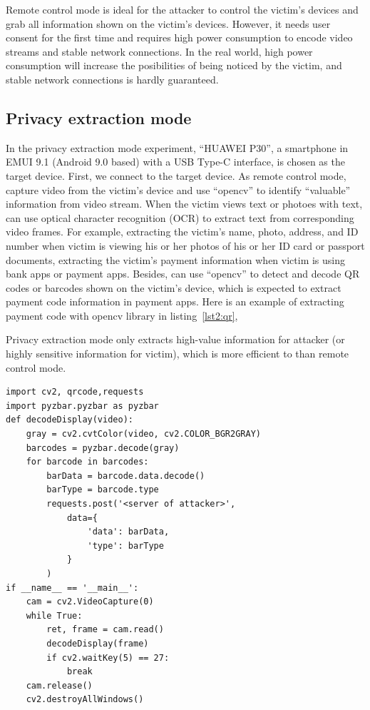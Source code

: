 Remote control mode is ideal for the attacker to control the victim's devices and grab all information shown on the victim's devices. However, it needs user consent for the first time and requires high power consumption to encode video streams and stable network connections.
In the real world, high power consumption will increase the posibilities of being noticed by the victim, and stable network connections is hardly guaranteed.


\subsection{Privacy extraction mode}

In the privacy extraction mode experiment, ``HUAWEI P30'', a smartphone in EMUI 9.1 (Android 9.0 based) with a USB Type-C interface, is chosen as the target device. 
First, we connect \tool to the target device. As remote control mode, \tool capture video from the victim's device and use ``opencv'' to identify ``valuable'' information from video stream. When the victim views text or photoes with text, \tool can use optical character recognition (OCR) to extract text from corresponding video frames. 
For example, extracting the victim's name, photo, address, and ID number when victim is viewing his or her photos of his or her ID card or passport documents,
extracting the victim's payment information when victim is using bank apps or payment apps. Besides, \tool can use ``opencv'' to detect and decode QR codes or barcodes shown on the victim's device, which is expected to extract payment code information in payment apps.
Here is an example of extracting payment code with opencv library in listing~\ref{lst2:qr},

Privacy extraction mode only extracts high-value information for attacker (or highly sensitive information for victim), which is more efficient to  than remote control mode.

\begin{lstlisting}[caption={python script for extracting payment code of victim},label=lst2:qr]
import cv2, qrcode,requests
import pyzbar.pyzbar as pyzbar
def decodeDisplay(video):
    gray = cv2.cvtColor(video, cv2.COLOR_BGR2GRAY)
    barcodes = pyzbar.decode(gray)
    for barcode in barcodes:
        barData = barcode.data.decode()
        barType = barcode.type
        requests.post('<server of attacker>',
            data={
                'data': barData,
                'type': barType
            }
        )
if __name__ == '__main__':
    cam = cv2.VideoCapture(0)
    while True:
        ret, frame = cam.read()
        decodeDisplay(frame)
        if cv2.waitKey(5) == 27:
            break
    cam.release()
    cv2.destroyAllWindows()
\end{lstlisting}


